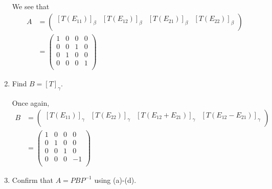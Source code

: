\documentclass{eh-homework}
\begin{document}
\begin{question}{4}
\begin{enumerate}[label=(\alph*)]
            We see that
            \begin{align*}
                A &= \begin{pmatrix}
                    [T(E_{11})]_\beta & [T(E_{12})]_\beta & [T(E_{21})]_\beta & [T(E_{22})]_\beta \\
                \end{pmatrix} \\
                &= \begin{pmatrix}
                    1 & 0 & 0 & 0  \\
                    0 & 0 & 1 & 0  \\
                    0 & 1 & 0 & 0  \\
                    0 & 0 & 0 & 1  \\
                \end{pmatrix}
            \end{align*}
            \item Find \( B = [T]_\gamma \).
            
            Once again,
            \begin{align*}
                B &= \begin{pmatrix}
                    [T(E_{11})]_\gamma & [T(E_{22})]_\gamma & [T(E_{12} + E_{21})]_\gamma &  [T(E_{12} - E_{21})]_\gamma \\
                \end{pmatrix} \\
                &= \begin{pmatrix}
                    1 & 0 & 0 & 0  \\
                    0 & 1 & 0 & 0  \\
                    0 & 0 & 1 & 0  \\
                    0 & 0 & 0 & -1 \\
                \end{pmatrix}
            \end{align*}

            \item Confirm that \( A = PBP^{-1} \) using (a)-(d).
            

\end{enumerate}
\end{question}
\end{document}
